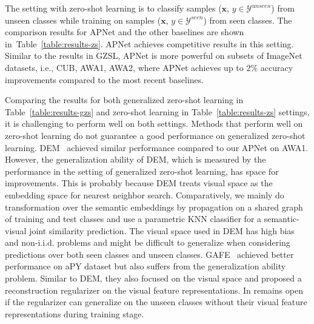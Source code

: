 \documentclass[letterpaper]{article} %
\def\Tabref#1{Table~\ref{#1}}
\def\vx{{\bm{x}}}
\begin{document}
\noindent The setting with zero-shot learning is to classify samples ($\vx$, $y \in \mathcal{Y}^{unseen}$) from unseen classes while training on samples ($\vx$, $y \in \mathcal{Y}^{seen}$) from seen classes. The comparison results for APNet and the other baselines are shown in~\Tabref{table:results-zs}.
APNet achieves competitive results in this setting.
Similar to the results in GZSL, APNet is more powerful on subsets of ImageNet datasets, i.e., CUB, AWA1, AWA2, where APNet achieves up to $2\%$ accuracy improvements compared to the most recent baselines.


Comparing the results for both generalized zero-shot learning in Table~\ref{table:results-gzs} and zero-shot learning in Table~\ref{table:results-zs} settings, it is challenging to perform well on both settings. Methods that perform well on zero-shot learning do not guarantee a good performance on generalized zero-shot learning.
DEM~\cite{zhang2017learning} achieved similar performance compared to our APNet on AWA1. However, the generalization ability of DEM, which is measured by the performance in the setting of generalized zero-shot learning, has space for improvements. This is probably because DEM treats visual space as the embedding space for nearest neighbor search. Comparatively, we mainly do transformation over the semantic embeddings by propagation on a shared graph of training and test classes and use a parametric KNN classifier for a semantic-visual joint similarity prediction.
The visual space used in DEM has high bias and non-i.i.d. problems and might be difficult to generalize when considering predictions over both seen classes and unseen classes.
GAFE~\cite{wang2017mgae} achieved better performance on aPY dataset but also suffers from the generalization ability problem. Similar to DEM, they also focused on the visual space and proposed a reconstruction regularizer on the visual feature representations. In remains open if the regularizer can generalize on the unseen classes without their visual feature representations during training stage.




\end{document}
